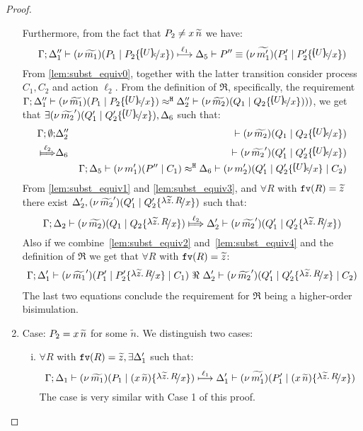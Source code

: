 \begin{proof}
\begin{enumerate}
	\noi Furthermore, from the fact that $P_2 \not= x\, {\widetilde{n}}$ we have:
%
\[
	\horel{\Gamma}{\Delta_1''}{\newsp{\widetilde{m_1}}{P_1 \Par P_2 \subst{\omapchar{U}}{x}}}{\hby{\ell_1}}
	{\Delta_5}{P'' \scong \newsp{\widetilde{m_1'}}{P_1' \Par P_2' \subst{\omapchar{U}}{x}}}
\]
%
	\noi
		From \ref{lem:subst_equiv0}, together with the latter transition consider process $C_1, C_2$ and action $\ell_2$.
		From the definition of $\Re$, specifically, the requirement
		$\horel{\Gamma}{\Delta_1''}{\newsp{\widetilde{m_1}}{P_1 \Par P_2 \subst{\omapchar{U}}{x}}}
		{\hwb}{\Delta_2''}{\newsp{\widetilde{m_2}}{Q_1 \Par Q_2 \subst{\omapchar{U}}{x}}))}$,
		we get that $\exists \newsp{\widetilde{m_2}'}{Q_1' \Par Q_2' \subst{\omapchar{U}}{x}}, \Delta_6$ such that:
%
	\begin{eqnarray}
		\Gamma; \es; &\Delta_2''& \proves \newsp{\widetilde{m_2}}{Q_1 \Par Q_2 \subst{\omapchar{U}}{x}} \nonumber \\
		\Hby{\ell_2} &\Delta_6& \proves \newsp{\widetilde{m_2}'}{Q_1' \Par Q_2' \subst{\omapchar{U}}{x}}
		\label{lem:subst_equiv3}
		\\
		&&\horel{\Gamma}{\Delta_5}{\newsp{m_1'}{P'' \Par C_1}}{\hwb}{\Delta_6}{\newsp{m_2'}{Q_1' \Par Q_2' \subst{\omapchar{U}}{x} \Par C_2}} \label{lem:subst_equiv4}
	\end{eqnarray}
%
	\noi From \eqref{lem:subst_equiv1} and \eqref{lem:subst_equiv3}, and $\forall R$ with $\mathtt{fv}(R) = \widetilde{z}$
	there exist $\Delta_2', \newsp{\widetilde{m_2}'}{Q_1' \Par Q_2' \subst{\abs{\widetilde{z}}{R}}{x}}$ such that:
%
	\[
		\horel{\Gamma}{\Delta_2}{\newsp{\widetilde{m_2}}{Q_1 \Par Q_2 \subst{\abs{\widetilde{z}}{R}}{x}}}
		{\Hby{\ell_2}}
		{\Delta_2'}{\newsp{\widetilde{m_2}'}{Q_1' \Par Q_2' \subst{\abs{\widetilde{z}}{R}}{x}}}
	\]
	\noi
		Also if we combine~\eqref{lem:subst_equiv2} and~\eqref{lem:subst_equiv4} and the definition of $\Re$ we get that
		$\forall R$ with $\mathtt{fv}(R) = \widetilde{z}$:
	\begin{eqnarray*}
		\horel{\Gamma}{\Delta_1'}{\newsp{\widetilde{m_1}'}{P_1' \Par P_2' \subst{\abs{\widetilde{z}}{R}}{x} \Par C_1}}
		{\ \Re\ }
		{\Delta_2'}{\newsp{\widetilde{m_2}'}{Q_1' \Par Q_2' \subst{\abs{\widetilde{z}}{R}}{x} \Par C_2}}
	\end{eqnarray*}
	The last two equations conclude the requirement for
	$\Re$ being a higher-order bisimulation.
%


	\item	Case: $P_2 = x\, {\widetilde{n}}$ for some $\widetilde{n}$.
			We distinguish two cases:
			\begin{enumerate}[i.]
				\item 	\noi $\forall R$ with $\mathtt{fv}(R) = \widetilde{z}, \exists \Delta_1'$ such that:
%
						\[
							\horel{\Gamma}{\Delta_1}{\newsp{\widetilde{m_1}}{P_1 \Par (\appl{x}{\widetilde{n}}) \subst{\abs{\widetilde{z}}{R}}{x}}}
							{\hby{\ell_1}}
							{\Delta_1'}{}{\newsp{\widetilde{m_1'}}{P_1' \Par (\appl{x}{\widetilde{n}}) \subst{\abs{\widetilde{z}}{R}}{x}}}
						\]
%
						\noi The case is very similar with Case 1 of this proof.


\end{enumerate}
\end{enumerate}
\end{proof}
